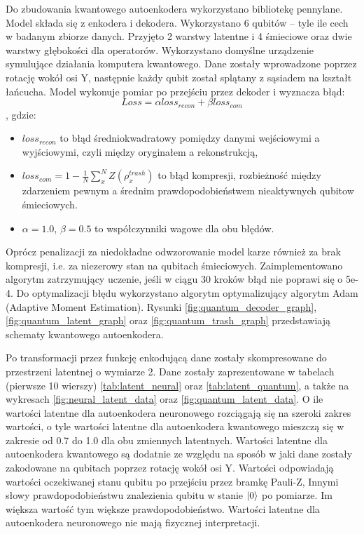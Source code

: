 Do zbudowania kwantowego autoenkodera wykorzystano bibliotekę pennylane. Model składa się z enkodera i dekodera. Wykorzystano 6 qubitów – tyle ile cech w badanym zbiorze danych. Przyjęto 2 warstwy latentne i 4 śmieciowe oraz dwie warstwy głębokości dla operatorów. Wykorzystano domyślne urządzenie symulujące działania komputera kwantowego. Dane zostały wprowadzone poprzez rotację wokół osi Y, następnie każdy qubit został splątany z sąsiadem na kształt łańcucha.
Model wykonuje pomiar po przejściu przez dekoder i wyznacza błąd:
\[ Loss = \alpha loss_{recon} + \beta loss_{com}\],
gdzie:
\begin{itemize}
    \item $loss_{recon}$ to błąd średniokwadratowy pomiędzy danymi wejściowymi a wyjściowymi, czyli między oryginałem a rekonstrukcją,
    \item $loss_{com} = 1 - \frac{1}{N}\sum_{x}^{N}Z\left(\rho_{x}^{trash}\right)$ to błąd kompresji, rozbieżność między zdarzeniem pewnym a średnim prawdopodobieństwem nieaktywnych qubitow śmieciowych.
    \item $\alpha = 1.0$, $\beta=0.5$ to współczynniki wagowe dla obu błędów.
\end{itemize}

Oprócz penalizacji za niedokładne odwzorowanie model karze również za brak kompresji, i.e. za niezerowy stan na qubitach śmieciowych.
Zaimplementowano algorytm zatrzymujący uczenie, jeśli w ciągu 30 kroków błąd nie poprawi się o 5e-4. Do optymalizacji błędu wykorzystano algorytm optymalizujący algorytm Adam (Adaptive Moment Estimation). 
Rysunki \ref{fig:quantum_decoder_graph}, \ref{fig:quantum_latent_graph} oraz \ref{fig:quantum_trash_graph} przedstawiają schematy kwantowego autoenkodera.

Po transformacji przez funkcję enkodującą dane zostały skompresowane do przestrzeni latentnej o wymiarze 2. Dane zostały zaprezentowane w tabelach (pierwsze 10 wierszy) \ref{tab:latent_neural} oraz \ref{tab:latent_quantum}, a także na wykresach \ref{fig:neural_latent_data} oraz \ref{fig:quantum_latent_data}. O ile wartości latentne dla autoenkodera neuronowego rozciągają się na szeroki zakres wartości, o tyle wartości latentne dla autoenkodera kwantowego mieszczą się w zakresie od 0.7 do 1.0 dla obu zmiennych latentnych. Wartości latentne dla autoenkodera kwantowego są dodatnie ze względu na sposób w jaki dane zostały zakodowane na qubitach poprzez rotację wokół osi Y. Wartości odpowiadają wartości oczekiwanej stanu qubitu po przejściu przez bramkę Pauli-Z, Innymi słowy prawdopodobieństwu znalezienia qubitu w stanie $\ket{0}$ po pomiarze. Im większa wartość tym większe prawdopodobieństwo. Wartości latentne dla autoenkodera neuronowego nie mają fizycznej interpretacji. 

